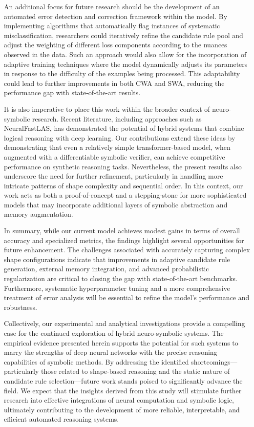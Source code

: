 \documentclass{article}
\begin{document}
An additional focus for future research should be the development of an automated error detection and correction framework within the model. By implementing algorithms that automatically flag instances of systematic misclassification, researchers could iteratively refine the candidate rule pool and adjust the weighting of different loss components according to the nuances observed in the data. Such an approach would also allow for the incorporation of adaptive training techniques where the model dynamically adjusts its parameters in response to the difficulty of the examples being processed. This adaptability could lead to further improvements in both CWA and SWA, reducing the performance gap with state-of-the-art results.

It is also imperative to place this work within the broader context of neuro-symbolic research. Recent literature, including approaches such as NeuralFastLAS, has demonstrated the potential of hybrid systems that combine logical reasoning with deep learning. Our contributions extend these ideas by demonstrating that even a relatively simple transformer-based model, when augmented with a differentiable symbolic verifier, can achieve competitive performance on synthetic reasoning tasks. Nevertheless, the present results also underscore the need for further refinement, particularly in handling more intricate patterns of shape complexity and sequential order. In this context, our work acts as both a proof-of-concept and a stepping-stone for more sophisticated models that may incorporate additional layers of symbolic abstraction and memory augmentation.

In summary, while our current model achieves modest gains in terms of overall accuracy and specialized metrics, the findings highlight several opportunities for future enhancement. The challenges associated with accurately capturing complex shape configurations indicate that improvements in adaptive candidate rule generation, external memory integration, and advanced probabilistic regularization are critical to closing the gap with state-of-the-art benchmarks. Furthermore, systematic hyperparameter tuning and a more comprehensive treatment of error analysis will be essential to refine the model’s performance and robustness.

Collectively, our experimental and analytical investigations provide a compelling case for the continued exploration of hybrid neuro-symbolic systems. The empirical evidence presented herein supports the potential for such systems to marry the strengths of deep neural networks with the precise reasoning capabilities of symbolic methods. By addressing the identified shortcomings—particularly those related to shape-based reasoning and the static nature of candidate rule selection—future work stands poised to significantly advance the field. We expect that the insights derived from this study will stimulate further research into effective integrations of neural computation and symbolic logic, ultimately contributing to the development of more reliable, interpretable, and efficient automated reasoning systems.
\end{document}
